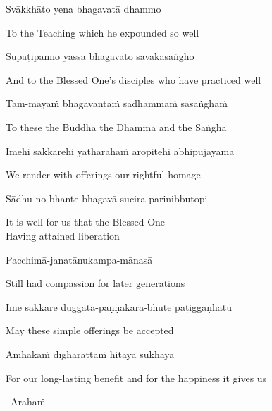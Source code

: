 Svākkhāto yena bhagavatā dhammo

\begin{english}
  To the Teaching which he expounded so well
\end{english}

Supaṭipanno yassa bhagavato sāvakasaṅgho

\begin{english}
  And to the Blessed One's disciples who have practiced well
\end{english}

Tam-mayaṁ bhagavantaṁ sadhammaṁ sasaṅghaṁ

\begin{english}
  To these the Buddha the Dhamma and the Saṅgha
\end{english}

Imehi sakkārehi yathārahaṁ āropitehi abhipūjayāma

\begin{english}
  We render with offerings our rightful homage
\end{english}

Sādhu no bhante bhagavā sucira-parinibbutopi

\begin{english}
  It is well for us that the Blessed One\\
  Having attained liberation
\end{english}

Pacchimā-janatānukampa-mānasā

\begin{english}
  Still had compassion for later generations
\end{english}

Ime sakkāre duggata-paṇṇākāra-bhūte paṭiggaṇhātu

\begin{english}
  May these simple offerings be accepted
\end{english}

Amhākaṁ dīgharattaṁ hitāya sukhāya

\begin{english}
  For our long-lasting benefit and for the happiness it gives us
\end{english}

\clearpage

\begin{leader}
  \anglebracketleft\ \hspace{-0.5mm}Arahaṁ \hspace{-0.5mm}\anglebracketright\
\end{leader}

